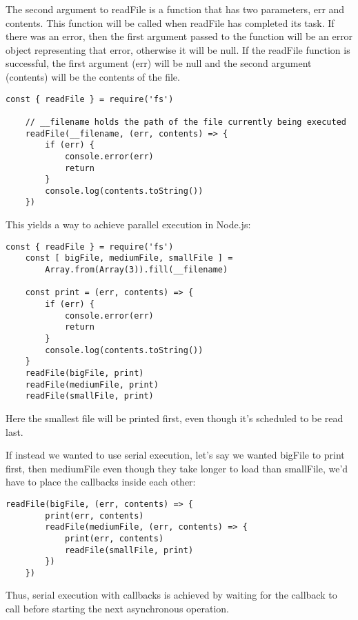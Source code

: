\documentclass{scrartcl}
\begin{document}
The second argument to readFile is a function that has two parameters, err and contents. This function will be called when readFile has completed its task. If there was an error, then the first argument passed to the function will be an error object representing that error, otherwise it will be null. If the readFile function is successful, the first argument (err) will be null and the second argument (contents) will be the contents of the file.

\begin{lstlisting}[style=ES6]
    const { readFile } = require('fs')

    // __filename holds the path of the file currently being executed
    readFile(__filename, (err, contents) => {
        if (err) {
            console.error(err)
            return
        }
        console.log(contents.toString())
    })
\end{lstlisting}

This yields a way to achieve parallel execution in Node.js:

\begin{lstlisting}[style=ES6]
    const { readFile } = require('fs')
    const [ bigFile, mediumFile, smallFile ] =
        Array.from(Array(3)).fill(__filename)

    const print = (err, contents) => {
        if (err) {
            console.error(err)
            return
        }
        console.log(contents.toString())
    }
    readFile(bigFile, print)
    readFile(mediumFile, print)
    readFile(smallFile, print)
\end{lstlisting}

Here the smallest file will be printed first, even though it's scheduled to be read last.

If instead we wanted to use serial execution, let's say we wanted bigFile to print first, then mediumFile even though they take longer to load than smallFile, we'd have to place the callbacks inside each other:

\begin{lstlisting}[style=ES6]
    readFile(bigFile, (err, contents) => {
        print(err, contents)
        readFile(mediumFile, (err, contents) => {
            print(err, contents)
            readFile(smallFile, print)
        })
    })
\end{lstlisting}


Thus, serial execution with callbacks is achieved by waiting for the callback to call before starting the next asynchronous operation.
\end{document}
